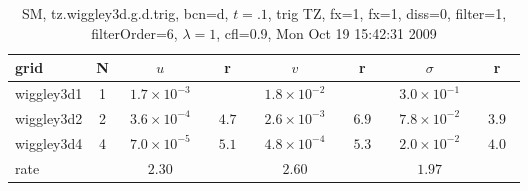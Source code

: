 \begin{table}[hbt]\tableFont %
\begin{center}
\begin{tabular}{|l|c|c|c|c|c|c|c|} \hline 
grid  & N &  $u$  & r &  $v$  & r &  $\sigma$   & r \\ \hline 
          wiggley3d1 &     1 & ~$1.7\times10^{ -3}$~ &           & ~$1.8\times10^{ -2}$~ &           & ~$3.0\times10^{ -1}$~ &            \\ \hline
          wiggley3d2 &     2 & ~$3.6\times10^{ -4}$~ & ~$  4.7$~ & ~$2.6\times10^{ -3}$~ & ~$  6.9$~ & ~$7.8\times10^{ -2}$~ & ~$  3.9$~  \\ \hline
          wiggley3d4 &     4 & ~$7.0\times10^{ -5}$~ & ~$  5.1$~ & ~$4.8\times10^{ -4}$~ & ~$  5.3$~ & ~$2.0\times10^{ -2}$~ & ~$  4.0$~  \\ \hline
    rate             &       &       $2.30$         &       &       $2.60$         &       &       $1.97$         &        \\ \hline
\end{tabular}
\caption{SM, tz.wiggley3d.g.d.trig, bcn=d, $t=.1$, trig TZ, fx=1, fx=1, diss=0, filter=1, filterOrder=6, $\lambda=1$, cfl=0.9,  Mon Oct 19 15:42:31 2009}\label{table:tz.wiggley3d.g.d.trig}
\end{center}
\end{table}
